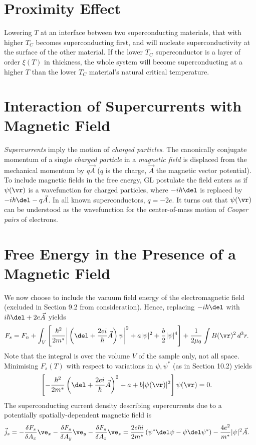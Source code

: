 \documentclass[a4paper, 11pt, normalem]{report}
\begin{document}
\section{Proximity Effect}
Lowering $T$ at an interface between two superconducting materials, that with higher $T_C$ becomes superconducting first, and will nucleate superconductivity at the surface of the other material.
If the lower $T_C$ superconductor is a layer of order $\xi(T)$ in thickness, the whole system will become superconducting at a higher $T$ than the lower $T_C$ material's natural critical temperature.

\section{Interaction of Supercurrents with Magnetic Field}
\emph{Supercurrents} imply the motion of \emph{charged particles}.
The canonically conjugate momentum of a single \emph{charged particle} in a \emph{magnetic field} is displaced from the mechanical momentum by $q\vec{A}$ ($q$ is the charge, $\vec{A}$ the magnetic vector potential).
To include magnetic fields in the free energy, GL postulate the field enters as if $\psi(\vr)$ is a wavefunction for charged particles, where $-i\hbar\del$ is replaced by $-i\hbar\del-q\vec{A}$.
In all known superconductors, $q=-2e$.
It turns out that $\psi(\vr)$ can be understood as the wavefunction for the center-of-mass motion of \emph{Cooper pairs} of electrons.

\section{Free Energy in the Presence of a Magnetic Field}
We now choose to include the vacuum field energy of the electromagnetic field (excluded in Section 9.2 from consideration).
Hence, replacing $-i\hbar\del$ with $i\hbar\del+2e\vec{A}$ yields
\begin{align}
    F_s &= F_n + \int_V \left[\frac{\hbar^2}{2m^*}\bigg|\left(\del+\frac{2ei}{\hbar}\vec{A}\right)\psi\bigg|^2 + a|\psi|^2 + \frac{b}{2}|\psi|^4\right] + \frac{1}{2\mu_0}\int B(\vr)^2\,d^3r.
\end{align}
Note that the integral is over the volume $V$ of the sample only, not all space.
Minimising $F_s(T)$ with respect to variations in $\psi,\psi^*$ (as in Section 10.2) yields
\begin{align}
    \left[-\frac{\hbar^2}{2m^*}\left(\del+\frac{2ei}{\hbar}\vec{A}\right)^2+a+b|\psi(\vr)|^2\right]\psi(\vr) &= 0.
\end{align}
The superconducting current density describing supercurrents due to a potentially spatially-dependent magnetic field is
\begin{align}
    \vec{j}_s &= -\frac{\delta F_s}{\delta A_x}\ve_x - \frac{\delta F_s}{\delta A_y}\ve_y - \frac{\delta F_s}{\delta A_z}\ve_z = \frac{2e\hbar i}{2m^*} \left(\psi^*\del\psi-\psi\del\psi^*\right) - \frac{4e^2}{m^*}|\psi|^2\vec{A}.
\end{align}
\end{document}
